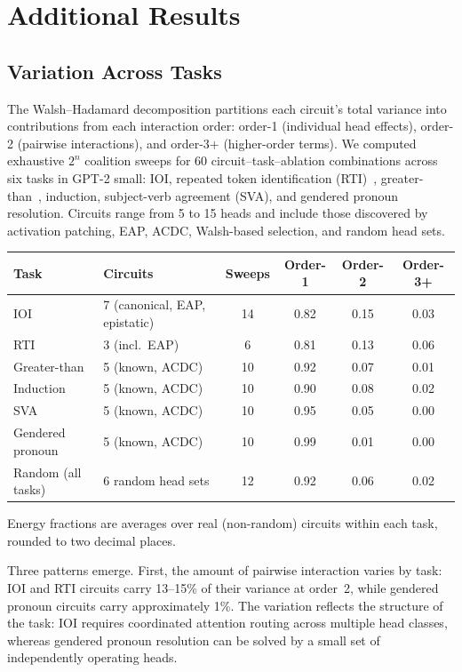 \documentclass{article}
\begin{document}
\section{Additional Results}


\subsection{Variation Across Tasks}
\label{sec:energy-spectrum}

The Walsh--Hadamard decomposition partitions each circuit's total
variance into contributions from each interaction order: order-1
(individual head effects), order-2 (pairwise interactions), and
order-3+ (higher-order terms). We computed exhaustive $2^n$ coalition
sweeps for 60 circuit--task--ablation combinations across six tasks in
GPT-2 small: IOI, repeated token identification
(RTI)~\citep{tower2025rti}, greater-than~\citep{hanna2023greater},
induction, subject-verb agreement (SVA), and gendered pronoun
resolution. Circuits range from 5 to 15 heads and include those
discovered by activation patching, EAP, ACDC, Walsh-based selection,
and random head sets.

\medskip

{\small
\begin{tabular}{llcccc}
\toprule
Task & Circuits & Sweeps & Order-1 & Order-2 & Order-3+ \\
\midrule
IOI            & 7 (canonical, EAP, epistatic) & 14 & 0.82 & 0.15 & 0.03 \\
RTI            & 3 (incl.\ EAP)               &  6 & 0.81 & 0.13 & 0.06 \\
Greater-than   & 5 (known, ACDC)               & 10 & 0.92 & 0.07 & 0.01 \\
Induction      & 5 (known, ACDC)               & 10 & 0.90 & 0.08 & 0.02 \\
SVA            & 5 (known, ACDC)               & 10 & 0.95 & 0.05 & 0.00 \\
Gendered pronoun & 5 (known, ACDC)             & 10 & 0.99 & 0.01 & 0.00 \\
\midrule
Random (all tasks) & 6 random head sets        & 12 & 0.92 & 0.06 & 0.02 \\
\bottomrule
\end{tabular}
}

\medskip

\noindent Energy fractions are averages over real (non-random) circuits
within each task, rounded to two decimal places.

Three patterns emerge. First, the amount of pairwise interaction varies
by task: IOI and RTI circuits carry 13--15\% of their variance at
order~2, while gendered pronoun circuits carry approximately 1\%. The
variation reflects the structure of the task: IOI requires coordinated
attention routing across multiple head classes, whereas gendered pronoun
resolution can be solved by a small set of independently operating heads.
\end{document}
